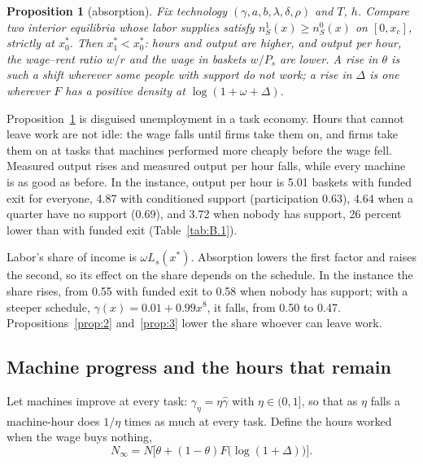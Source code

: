 \documentclass[12pt]{article}
\theoremstyle{plain}
\newtheorem{proposition}{Proposition}
\begin{document}
\begin{proposition}[absorption]\label{prop:1}
Fix technology $(\gamma,a,b,\lambda,\delta,\rho)$ and $T$, $h$. Compare two interior equilibria whose labor supplies satisfy $n_S^1(x)\ge n_S^0(x)$ on $[0,x_c]$, strictly at $x^*_0$. Then $x^*_1<x^*_0$: hours and output are higher, and output per hour, the wage--rent ratio $w/r$ and the wage in baskets $w/P_s$ are lower. A rise in $\theta$ is such a shift wherever some people with support do not work; a rise in $\Delta$ is one wherever $F$ has a positive density at $\log(1+\omega+\Delta)$.
\end{proposition}

Proposition~\ref{prop:1} is disguised unemployment in a task economy. Hours that cannot leave work are not idle: the wage falls until firms take them on, and firms take them on at tasks that machines performed more cheaply before the wage fell. Measured output rises and measured output per hour falls, while every machine is as good as before. In the instance, output per hour is 5.01 baskets with funded exit for everyone, 4.87 with conditioned support (participation 0.63), 4.64 when a quarter have no support (0.69), and 3.72 when nobody has support, 26 percent lower than with funded exit (Table~\ref{tab:B.1}).

Labor's share of income is $\omega L_s(x^*)$. Absorption lowers the first factor and raises the second, so its effect on the share depends on the schedule. In the instance the share rises, from 0.55 with funded exit to 0.58 when nobody has support; with a steeper schedule, $\gamma(x)=0.01+0.99x^{8}$, it falls, from 0.50 to 0.47. Propositions~\ref{prop:2} and~\ref{prop:3} lower the share whoever can leave work.

\subsection{Machine progress and the hours that remain}\label{sec:4.2}

Let machines improve at every task: $\gamma_\eta=\eta\hat\gamma$ with $\eta\in(0,1]$, so that as $\eta$ falls a machine-hour does $1/\eta$ times as much at every task. Define the hours worked when the wage buys nothing,
\begin{equation}\label{eq:10}
N_\infty=N\bigl[\theta+(1-\theta)F\bigl(\log(1+\Delta)\bigr)\bigr].
\end{equation}
\end{document}
